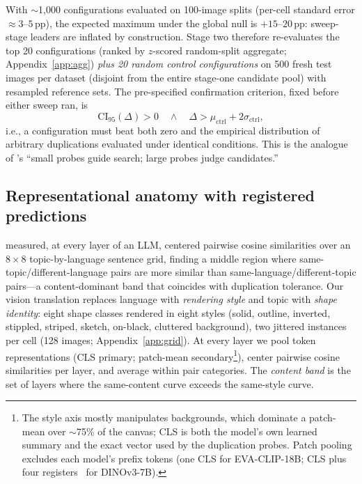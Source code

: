 \documentclass{article}
\newcommand{\eva}{EVA-CLIP-18B}
\newcommand{\dino}{DINOv3-7B}
\newcommand{\pp}{\,\mathrm{pp}}
\begin{document}
With $\sim$1{,}000 configurations evaluated on 100-image splits
(per-cell standard error $\approx 3$--$5\pp$), the expected maximum under
the global null is $+15$--$20\pp$: sweep-stage leaders are inflated by
construction. Stage two therefore re-evaluates the top 20 configurations
(ranked by $z$-scored random-split aggregate; Appendix~\ref{app:agg})
\emph{plus 20 random control configurations} on 500 fresh test images per
dataset (disjoint from the entire stage-one candidate pool) with
resampled reference sets. The pre-specified confirmation criterion,
fixed before either sweep ran, is
\begin{equation}
\label{eq:criterion}
\mathrm{CI}_{95}(\Delta) > 0 \quad \wedge \quad
\Delta > \mu_{\mathrm{ctrl}} + 2\sigma_{\mathrm{ctrl}},
\end{equation}
i.e., a configuration must beat both zero and the empirical distribution
of arbitrary duplications evaluated under identical conditions. This is
the analogue of \citet{hankins2025rysii}'s ``small probes guide search;
large probes judge candidates.''

\subsection{Representational anatomy with registered predictions}
\label{sec:anatomy}

\citet{hankins2025sapirwhorf} measured, at every layer of an LLM,
centered pairwise cosine similarities over an $8{\times}8$
topic-by-language sentence grid, finding a middle region where
same-topic/different-language pairs are more similar than
same-language/different-topic pairs---a content-dominant band that
coincides with duplication tolerance. Our vision translation replaces
language with \emph{rendering style} and topic with \emph{shape
identity}: eight shape classes rendered in eight styles (solid, outline,
inverted, stippled, striped, sketch, on-black, cluttered background), two
jittered instances per cell (128 images; Appendix~\ref{app:grid}).
At every layer we pool token representations (CLS primary; patch-mean
secondary\footnote{The style axis mostly manipulates backgrounds, which
dominate a patch-mean over $\sim$75\% of the canvas; CLS is both the
model's own learned summary and the exact vector used by the duplication
probes. Patch pooling excludes each model's prefix tokens (one CLS for
\eva{}; CLS plus four registers~\citep{darcet2024vision} for \dino{}).}),
center pairwise cosine similarities per layer, and average within pair
categories. The \emph{content band} is the set of layers where the
same-content curve exceeds the same-style curve.
\end{document}

